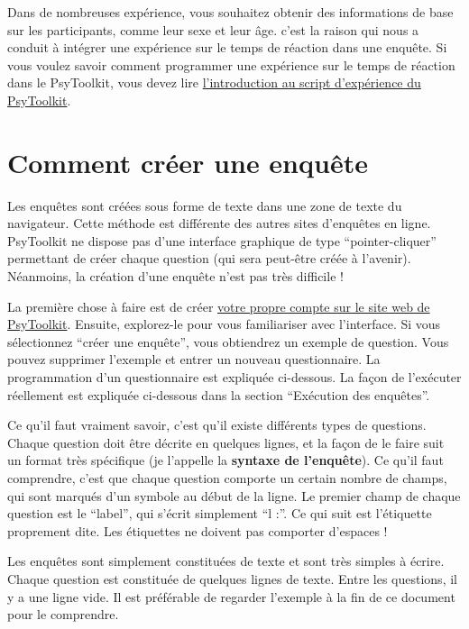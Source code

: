 \documentclass[
]{book}
\begin{document}
Dans de nombreuses expérience, vous souhaitez obtenir des informations
de base sur les participants, comme leur sexe et leur âge. c'est la
raison qui nous a conduit à intégrer une expérience sur le temps de
réaction dans une enquête. Si vous voulez savoir comment programmer une
expérience sur le temps de réaction dans le PsyToolkit, vous devez lire
\protect\hyperlink{s4}{l'introduction au script d'expérience du
PsyToolkit}.

\hypertarget{s7-2}{%
\section{Comment créer une enquête}\label{s7-2}}

Les enquêtes sont créées sous forme de texte dans une zone de texte du
navigateur. Cette méthode est différente des autres sites d'enquêtes en
ligne. PsyToolkit ne dispose pas d'une interface graphique de type
``pointer-cliquer'' permettant de créer chaque question (qui sera
peut-être créée à l'avenir). Néanmoins, la création d'une enquête n'est
pas très difficile !

La première chose à faire est de créer
\href{http://psytoolkit.gla.ac.uk}{votre propre compte sur le site web
de PsyToolkit}. Ensuite, explorez-le pour vous familiariser avec
l'interface. Si vous sélectionnez ``créer une enquête'', vous obtiendrez
un exemple de question. Vous pouvez supprimer l'exemple et entrer un
nouveau questionnaire. La programmation d'un questionnaire est expliquée
ci-dessous. La façon de l'exécuter réellement est expliquée ci-dessous
dans la section ``Exécution des enquêtes''.

Ce qu'il faut vraiment savoir, c'est qu'il existe différents types de
questions. Chaque question doit être décrite en quelques lignes, et la
façon de le faire suit un format très spécifique (je l'appelle la
\textbf{syntaxe de l'enquête}). Ce qu'il faut comprendre, c'est que
chaque question comporte un certain nombre de champs, qui sont marqués
d'un symbole au début de la ligne. Le premier champ de chaque question
est le ``label'', qui s'écrit simplement ``l :''. Ce qui suit est
l'étiquette proprement dite. Les étiquettes ne doivent pas comporter
d'espaces !

Les enquêtes sont simplement constituées de texte et sont très simples à
écrire. Chaque question est constituée de quelques lignes de texte.
Entre les questions, il y a une ligne vide. Il est préférable de
regarder l'exemple à la fin de ce document pour le comprendre.
\end{document}
